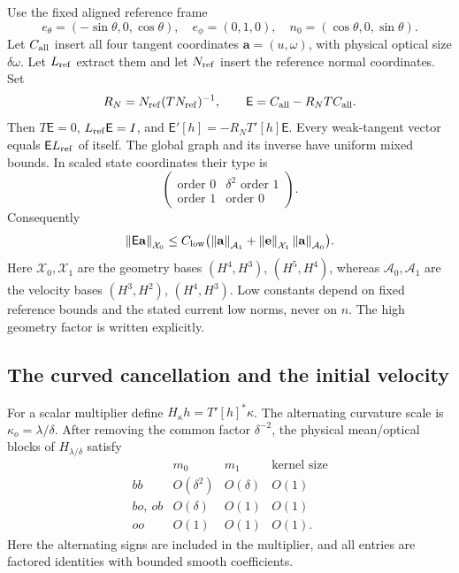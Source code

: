 \documentclass[11pt,a4paper]{article}
\numberwithin{equation}{section}
\theoremstyle{remark}
\newcommand{\norm}[1]{\left\lVert #1\right\rVert}
\newcommand{\Graph}{\mathsf E}
\newcommand{\Xzero}{\mathcal X_0}
\newcommand{\Xone}{\mathcal X_1}
\newcommand{\Azero}{\mathcal A_0}
\newcommand{\Aone}{\mathcal A_1}
\begin{document}
Use the fixed aligned reference frame
\[
 e_\theta=(-\sin\theta,0,\cos\theta),\quad
 e_\phi=(0,1,0),\quad n_0=(\cos\theta,0,\sin\theta).
\]
Let \(C_{\rm all}\) insert all four tangent coordinates
\(\mathbf a=(u,\omega)\), with physical optical size \(\delta\omega\).
Let \(L_{\rm ref}\) extract them and let \(N_{\rm ref}\) insert the
reference normal coordinates. Set
\begin{equation}\label{eq:graph}
 R_N=N_{\rm ref}(TN_{\rm ref})^{-1},\qquad
 \Graph=C_{\rm all}-R_NTC_{\rm all}.
\end{equation}
Then \(T\Graph=0\), \(L_{\rm ref}\Graph=I\), and
\(\Graph'[h]=-R_NT'[h]\Graph\).
Every weak-tangent vector equals \(\Graph L_{\rm ref}\) of itself.
The global graph and its inverse have uniform mixed bounds. In scaled
state coordinates their type is
\begin{equation}\label{eq:state-type}
 \begin{pmatrix}\text{order }0&\delta^2\text{ order }1\\
                 \text{order }1&\text{order }0\end{pmatrix}.
\end{equation}
Consequently
\begin{equation}\label{eq:graph-high}
 \norm{\Graph\mathbf a}_{\Xzero}
 \leq C_{\rm low}\bigl(\norm{\mathbf a}_{\Aone}
            +\norm{\mathbf e}_{\Xone}\norm{\mathbf a}_{\Azero}\bigr).
\end{equation}
Here \(\Xzero,\Xone\) are the geometry bases \((H^4,H^3)\),
\((H^5,H^4)\), whereas \(\Azero,\Aone\) are the velocity bases
\((H^3,H^2)\), \((H^4,H^3)\). Low constants depend on fixed reference
bounds and the stated current low norms, never on \(n\).
The high geometry factor is written explicitly.

\subsection{The curved cancellation and the initial velocity}

For a scalar multiplier define \(H_\kappa h=T'[h]^*\kappa\).
The alternating curvature scale is \(\kappa_o=\lambda/\delta\).
After removing the common factor \(\delta^{-2}\), the physical
mean/optical blocks of \(H_{\lambda/\delta}\) satisfy
\begin{equation}\label{eq:curved-moments}
 \begin{array}{c|ccc}
       &m_0&m_1&\text{kernel size}\\ \hline
 bb&O(\delta^2)&O(\delta)&O(1)\\
 bo,\ ob&O(\delta)&O(1)&O(1)\\
 oo&O(1)&O(1)&O(1).
 \end{array}
\end{equation}
Here the alternating signs are included in the multiplier, and all
entries are factored identities with bounded smooth coefficients.
\end{document}
